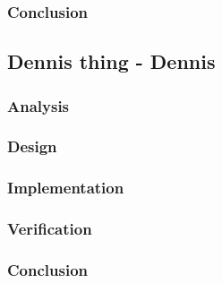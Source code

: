 \subsubsection{Conclusion}
\subsection{Dennis thing - Dennis}
%
\subsubsection{Analysis}
%
%
\subsubsection{Design}
%
%
\subsubsection{Implementation}
%
%
\subsubsection{Verification}
%
\subsubsection{Conclusion}
